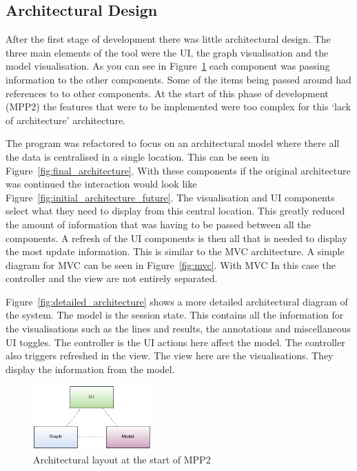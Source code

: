 \subsection{Architectural Design}
\label{sec:architecture}
After the first stage of development there was little architectural design.  The three main elements of the tool were the \ac{UI}, the graph visualisation and the model visualisation.   As you can see in Figure~\ref{fig:initial_architecture} each component was passing information to the other components.  Some of the items being passed around had references to to other components.  At the start of this phase of development (MPP2) the features that were to be implemented were too complex for this `lack of architecture' architecture.

The program was refactored to focus on an architectural model where there all the data is centralised in a single location.  This can be seen in Figure~\ref{fig:final_architecture}.  With these components if the original architecture was continued the interaction would look like Figure~\ref{fig:initial_architecture_future}.  The visualisation and \ac{UI} components select what they need to display from this central location.  This greatly reduced the amount of information that was having to be passed between all the components.  A refresh of the \ac{UI} components is then all that is needed to display the most update information.  This is similar to the \ac{MVC} architecture.  A simple diagram for \ac{MVC} can be seen in Figure~\ref{fig:mvc}.  With \ac{MVC} In this case the controller and the view are not entirely separated.

Figure~\ref{fig:detailed_architecture} shows a more detailed architectural diagram of the system.  The model is the session state.  This contains all the information for the visualisations such as the lines and results, the annotations and miscellaneous \ac{UI} toggles.  The controller is the \ac{UI} actions here affect the model.  The controller also triggers refreshed in the view.  The view here are the visualisations.  They display the information from the model.


\begin{figure}[h!]
    \centering
    \includegraphics[width=0.4\textwidth]{images/initial_architecture.png}
    \caption{Architectural layout at the start of MPP2}
    \label{fig:initial_architecture}
\end{figure}

